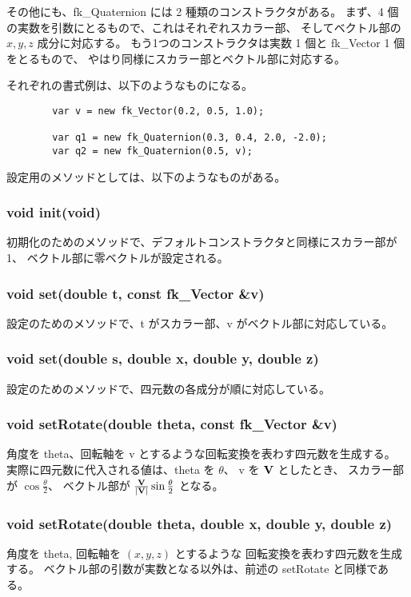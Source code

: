 その他にも、fk\_Quaternion には 2 種類のコンストラクタがある。
まず、4 個の実数を引数にとるもので、これはそれぞれスカラー部、
そしてベクトル部の \(x, y, z\) 成分に対応する。
もう1つのコンストラクタは実数 1 個と fk\_Vector 1 個をとるもので、
やはり同様にスカラー部とベクトル部に対応する。

それぞれの書式例は、以下のようなものになる。
\\
\begin{screen}
\begin{verbatim}
        var v = new fk_Vector(0.2, 0.5, 1.0);

        var q1 = new fk_Quaternion(0.3, 0.4, 2.0, -2.0);
        var q2 = new fk_Quaternion(0.5, v);
\end{verbatim}
\end{screen}

設定用のメソッドとしては、以下のようなものがある。

\subsubsection*{void init(void)}
初期化のためのメソッドで、デフォルトコンストラクタと同様にスカラー部が 1、
ベクトル部に零ベクトルが設定される。

\subsubsection*{void set(double t, const fk\_Vector \&v)}
設定のためのメソッドで、t がスカラー部、v がベクトル部に対応している。

\subsubsection*{void set(double s, double x, double y, double z)}
設定のためのメソッドで、四元数の各成分が順に対応している。

\subsubsection*{void setRotate(double theta, const fk\_Vector \&v)}
角度を theta、回転軸を v とするような回転変換を表わす四元数を生成する。
実際に四元数に代入される値は、theta を \(\theta\)、
v を \(\mathbf{V}\) としたとき、
スカラー部が \(\cos\frac{\theta}{2}\)、
ベクトル部が \(\frac{\mathbf{V}}{|\mathbf{V}|}\sin\frac{\theta}{2}\) となる。

\subsubsection*{void setRotate(double theta, double x, double y, double z)}
角度を theta, 回転軸を \((x, y, z)\) とするような
回転変換を表わす四元数を生成する。
ベクトル部の引数が実数となる以外は、前述の setRotate と同様である。

